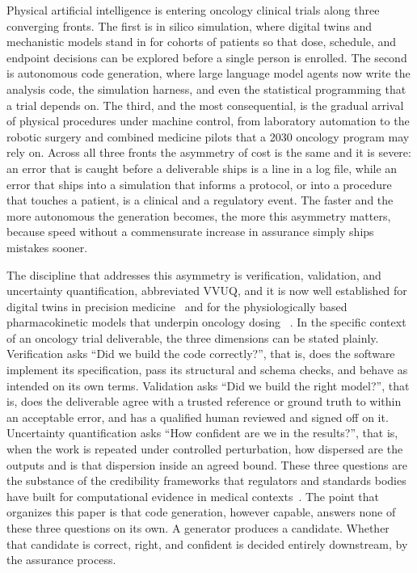 
Physical artificial intelligence is entering oncology clinical trials along
three converging fronts. The first is in silico simulation, where digital twins
and mechanistic models stand in for cohorts of patients so that dose, schedule,
and endpoint decisions can be explored before a single person is enrolled. The
second is autonomous code generation, where large language model agents now
write the analysis code, the simulation harness, and even the statistical
programming that a trial depends on. The third, and the most consequential, is
the gradual arrival of physical procedures under machine control, from
laboratory automation to the robotic surgery and combined medicine pilots that a
2030 oncology program may rely on. Across all three fronts the asymmetry of cost
is the same and it is severe: an error that is caught before a deliverable ships
is a line in a log file, while an error that ships into a simulation that informs
a protocol, or into a procedure that touches a patient, is a clinical and a
regulatory event. The faster and the more autonomous the generation becomes, the
more this asymmetry matters, because speed without a commensurate increase in
assurance simply ships mistakes sooner.

The discipline that addresses this asymmetry is verification, validation, and
uncertainty quantification, abbreviated VVUQ, and it is now well established for
digital twins in precision medicine~\cite{sel2025vvuq, moradi2026twins} and for
the physiologically based pharmacokinetic models that underpin oncology dosing
~\cite{zaid2025pbpk}. In the specific context of an oncology trial deliverable,
the three dimensions can be stated plainly. Verification asks ``Did we build the
code correctly?'', that is, does the software implement its specification, pass
its structural and schema checks, and behave as intended on its own terms.
Validation asks ``Did we build the right model?'', that is, does the deliverable
agree with a trusted reference or ground truth to within an acceptable error, and
has a qualified human reviewed and signed off on it. Uncertainty quantification
asks ``How confident are we in the results?'', that is, when the work is repeated
under controlled perturbation, how dispersed are the outputs and is that
dispersion inside an agreed bound. These three questions are the substance of the
credibility frameworks that regulators and standards bodies have built for
computational evidence in medical contexts~\cite{asmevv40, fda2023credibility}.
The point that organizes this paper is that code generation, however capable,
answers none of these three questions on its own. A generator produces a
candidate. Whether that candidate is correct, right, and confident is decided
entirely downstream, by the assurance process.

